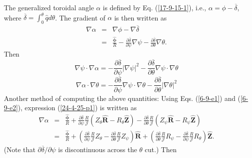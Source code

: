 \documentclass{llncs}
\newcommand{\tmmathbf}[1]{\ensuremath{\boldsymbol{#1}}}
\begin{document}
The generalized toroidal angle $\alpha$ is defined by Eq. (\ref{17-9-15-1}),
i.e., $\alpha = \phi - \overline{\delta}$, where $\overline{\delta} =
\int_0^{\theta} \hat{q} d \theta$. The gradient of $\alpha$ is then written as
\begin{eqnarray}
  \nabla \alpha & = & \nabla \phi - \nabla \overline{\delta} \nonumber\\
  & = & \frac{\hat{\tmmathbf{\phi}}}{R} - \frac{\partial
  \overline{\delta}}{\partial \psi} \nabla \psi - \frac{\partial
  \overline{\delta}}{\partial \theta} \nabla \theta .  \label{24-4-25-p1}
\end{eqnarray}
Then
\begin{equation}
  \nabla \psi \cdot \nabla \alpha = - \frac{\partial
  \overline{\delta}}{\partial \psi} | \nabla \psi |^2 - \frac{\partial
  \overline{\delta}}{\partial \theta} \nabla \psi \cdot \nabla \theta
\end{equation}
\begin{equation}
  \nabla \alpha \cdot \nabla \theta = - \frac{\partial
  \overline{\delta}}{\partial \psi} \nabla \psi \cdot \nabla \theta -
  \frac{\partial \overline{\delta}}{\partial \theta} | \nabla \theta |^2
\end{equation}
Another method of computing the above quantities: Using Eqs. (\ref{6-9-e1})
and (\ref{6-9-e2}), expression (\ref{24-4-25-p1}) is written as
\begin{eqnarray}
  \nabla \alpha & = & \frac{\hat{\tmmathbf{\phi}}}{R} + \frac{\partial
  \overline{\delta}}{\partial \psi} \frac{R}{\mathcal{J}} (Z_{\theta}
  \hat{\mathbf{R}} - R_{\theta} \hat{\mathbf{Z}}) - \frac{\partial
  \overline{\delta}}{\partial \theta} \frac{R}{\mathcal{J}} (Z_{\psi}
  \hat{\mathbf{R}} - R_{\psi} \hat{\mathbf{Z}}) \nonumber\\
  & = & \frac{\hat{\tmmathbf{\phi}}}{R} + \left( \frac{\partial
  \overline{\delta}}{\partial \psi} \frac{R}{\mathcal{J}} Z_{\theta} -
  \frac{\partial \overline{\delta}}{\partial \theta} \frac{R}{\mathcal{J}}
  Z_{\psi} \right) \hat{\mathbf{R}} + \left( \frac{\partial
  \overline{\delta}}{\partial \theta} \frac{R}{\mathcal{J}} R_{\psi} -
  \frac{\partial \overline{\delta}}{\partial \psi} \frac{R}{\mathcal{J}}
  R_{\theta} \right) \hat{\mathbf{Z}} . 
\end{eqnarray}
(Note that $\partial \overline{\delta} / \partial \psi$ is discontinuous
across the $\theta$ cut.) Then
\end{document}

